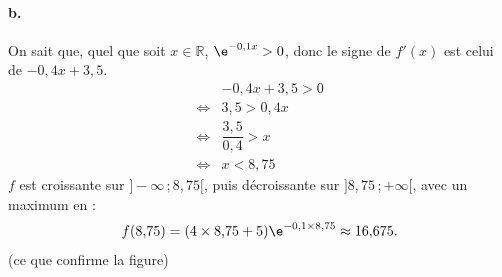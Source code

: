 \paragraph{b.} On sait que, quel que soit \( x \in \mathbb{R} \), \( \e^{-0{,}1x} > 0 \), donc le signe de \( f'(x) \) est celui de \( -0{,}4x + 3{,}5 \).
\begin{align*}
&-0{,}4x + 3{,}5 > 0  \\
\iff &3{,}5 > 0{,}4x \\
\iff &\dfrac{3{,}5}{0{,}4} > x \\
\iff &x < 8{,}75
\end{align*}
\( f \) est croissante sur \( ] -\infty \,; 8{,}75[ \), puis décroissante sur \( ]8{,}75 \,; +\infty[ \), avec un maximum en :
\[
f(8{,}75) = (4 \times 8{,}75 + 5)\e^{-0{,}1 \times 8{,}75} \approx 16{,}675.
\]
(ce que confirme la figure)
